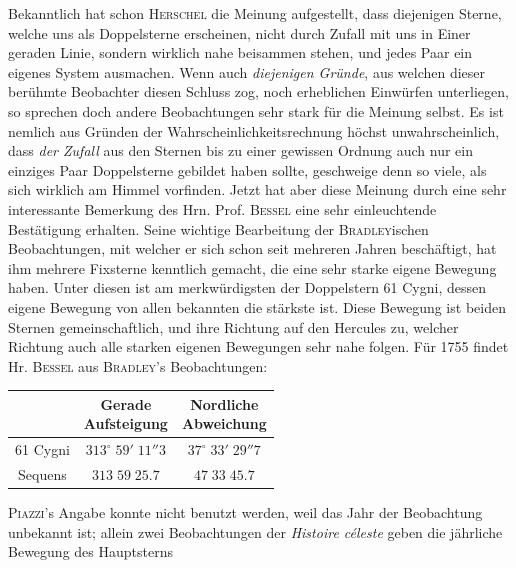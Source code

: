 \par\indent Bekanntlich hat schon \textsc{Herschel} die Meinung aufgestellt, dass diejenigen Sterne, welche uns als Doppelsterne erscheinen, nicht durch Zufall mit uns in Einer geraden Linie, sondern wirklich nahe beisammen stehen, und jedes Paar ein eigenes System ausmachen. Wenn auch \emph{diejenigen Gründe}, aus welchen dieser berühmte Beobachter diesen Schluss zog, noch erheblichen Einwürfen unterliegen, so sprechen doch andere Beobachtungen sehr stark für die Meinung selbst. Es ist nemlich aus Gründen der Wahrscheinlichkeitsrechnung höchst unwahrscheinlich, dass \emph{der Zufall} aus den Sternen bis zu einer gewissen Ordnung auch nur ein einziges Paar Doppelsterne gebildet haben sollte, geschweige denn so viele, als sich wirklich am Himmel vorfinden. Jetzt hat aber diese Meinung durch eine sehr interessante Bemerkung des Hrn. Prof. \textsc{Bessel} eine sehr einleuchtende Bestätigung erhalten. Seine wichtige Bearbeitung der \textsc{Bradley}ischen Beobachtungen, mit welcher er sich schon seit mehreren Jahren beschäftigt, hat ihm mehrere Fixsterne kenntlich gemacht, die eine sehr starke eigene Bewegung haben. Unter diesen ist am merkwürdigsten der Doppelstern 61 Cygni, dessen eigene Bewegung von allen bekannten die stärkste ist. Diese Bewegung ist beiden Sternen gemeinschaftlich, und ihre Richtung auf den Hercules zu, welcher Richtung auch alle starken eigenen Bewegungen sehr nahe folgen. Für 1755 findet Hr. \textsc{Bessel} aus \textsc{Bradley}'s Beobachtungen:

\begin{center}
\fontsize{10}{12}\selectfont\setlength{\tabcolsep}{3pt}\renewcommand{\arraystretch}{1.15}\begin{tabular}{c|c|c}
 & \shortstack{Gerade\\Aufsteigung} & \shortstack{Nordliche\\Abweichung} \\
\hline
61 Cygni & $313^\circ\;59'\;11''3$ & $37^\circ\;33'\;29''7$ \\
Sequens & $313\;59\;25.7$ & $47\;33\;45.7$ \\
\end{tabular}
\end{center}

\par\indent \textsc{Piazzi}'s Angabe konnte nicht benutzt werden, weil das Jahr der Beobachtung unbekannt ist; allein zwei Beobachtungen der \emph{Histoire céleste} geben die jährliche Bewegung des Hauptsterns

